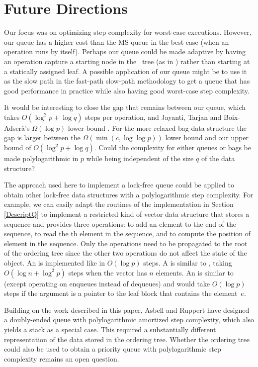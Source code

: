 
\section{Future Directions}

Our focus was on optimizing step complexity for worst-case executions.
However, our queue has a higher cost than the MS-queue in the best case (when an operation
runs by itself).
Perhaps our queue could be made adaptive by having an operation capture a starting node
in the \ordering\ tree (as in \cite{DBLP:conf/stoc/AfekDT95}) rather than starting at a statically assigned leaf.
A possible application of our queue  might be to use it as the slow path in the
fast-path slow-path methodology  \cite{10.1145/2370036.2145835} to
get a queue that has good performance in practice while also having good worst-case step complexity.

It would be interesting to close the gap that remains between our queue, which takes $O(\log^2 p + \log q)$ steps per operation,
and Jayanti, Tarjan and Boix-Adser\`{a}'s $\Omega(\log p)$ lower bound \cite{JTB19}.
For the more relaxed bag data structure the gap is larger between the  $\Omega(\min(c,\log\log p))$ lower bound \cite{DBLP:conf/opodis/AttiyaF17} and our upper bound of $O(\log^2 p + \log q)$.
Could the complexity for either queues or bags be made polylogarithmic in $p$ while being independent of the size $q$ of the data structure?

The approach used here to implement a lock-free queue 
could be applied to obtain other lock-free
data structures with a polylogarithmic step complexity.
For example, we can easily adapt the routines of the implementation in Section \ref{DescriptQ} 
to implement a restricted kind of vector data structure that stores a sequence and
provides three operations:  to add an element  to the end of the sequence,
 to read the th element in the sequence, and
 to compute the position of element  in the sequence.
Only the  operations need to be propagated to the root of the ordering tree
since the other two operations do not affect the state of the object.
An  is implemented like  in $O(\log p)$ steps.  
A  is similar to , taking $O(\log n + \log^2p)$ steps when the vector has $n$ elements.  
An  is similar to  (except operating on enqueues instead of dequeues) and would take $O(\log p)$ steps if the argument is a pointer to the leaf block that contains the element~$e$.

Building on the work described in this paper, Asbell and Ruppert \cite{AR23} have
designed a doubly-ended queue with polylogarithmic amortized step
complexity, which also yields a stack as a special case.  
This required a substantially different representation of the data stored in the ordering tree.
Whether the ordering tree could also be used to obtain a priority queue with polylogarithmic step complexity
remains an open question.


